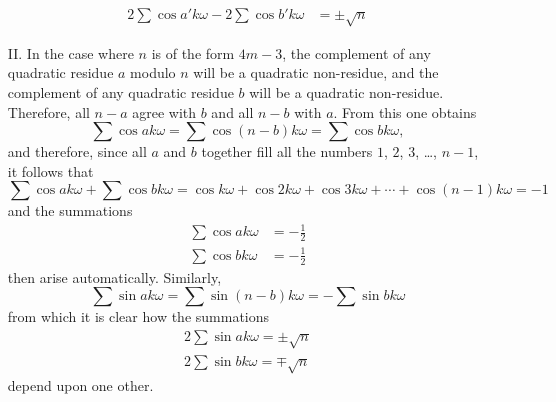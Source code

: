 \documentclass{book}
\theoremstyle{plain}
\theoremstyle{remark}
\begin{document}
\begin{enumerate}
\begin{align*}
2\sum \cos a' k \omega - 2 \sum \cos b'k\omega &= \pm \sqrt{n} \end{align*}
\item[II.] In the case where $n$ is of the form $4m-3$, the complement of any quadratic residue $a$ modulo $n$ will be a quadratic non-residue, and the complement of any quadratic residue $b$ will be a quadratic non-residue.  Therefore, all $n-a$ agree with $b$ and all $n-b$ with $a$.  From this one obtains
\[ \sum \cos ak\omega = \sum \cos(n-b)k\omega = \sum \cos bk\omega, \]
and therefore, since all $a$ and $b$ together fill all the numbers $1$, $2$, $3$, \dots, $n-1$, it follows that
\[ \sum \cos ak\omega + \sum \cos bk\omega = \cos k\omega + \cos 2k\omega + \cos 3k\omega + \cdots + \cos (n-1) k\omega = -1 \]
and the summations
\begin{align*} \sum \cos ak\omega &= -\tfrac{1}{2} \\
\sum \cos bk\omega &= -\tfrac{1}{2} \end{align*} 
then arise automatically.  Similarly,
\[ \sum \sin ak\omega = \sum \sin(n-b)k\omega = - \sum \sin bk\omega \]
from which it is clear how the summations 
\begin{align*} 2 \sum \sin ak\omega = \pm \sqrt{n} \\
2\sum \sin bk\omega = \mp \sqrt{n} \end{align*}
depend upon one other.
\end{enumerate} 
\end{document}
